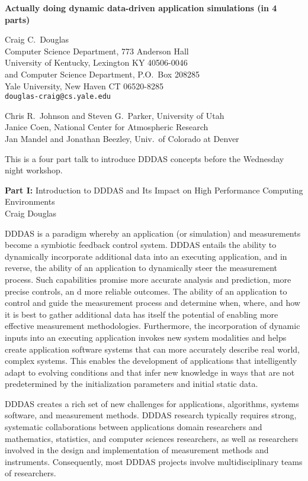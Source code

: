 \documentclass{report}
\begin{document}

\begin{center}
{\large
{\bf Actually doing dynamic data-driven application simulations (in 4 parts)}}

	Craig C.~Douglas \\
	Computer Science Department, 773 Anderson Hall \\
	University of Kentucky, Lexington KY 40506-0046 \\
	and Computer Science Department, P.O.~Box 208285 \\
	Yale University,  New Haven CT 06520-8285 \\
	{\tt douglas-craig@cs.yale.edu}

	Chris R.~Johnson and Steven G.~Parker, University of Utah \\
	Janice Coen, National Center for Atmospheric Research \\
	Jan Mandel and Jonathan Beezley, Univ.~of Colorado at Denver
\end{center}
This is a four part talk to introduce DDDAS concepts before
the Wednesday night workshop.

{\bf Part I:} Introduction to DDDAS and Its Impact on High
Performance Computing Environments \\
Craig Douglas

DDDAS is a paradigm whereby an application (or simulation)
and measurements become a symbiotic feedback control system.
DDDAS entails the ability to dynamically incorporate
additional data into an executing application, and in
reverse, the ability of an application to dynamically steer
the measurement process.  Such capabilities promise more
accurate analysis and prediction, more precise controls, an
d more reliable outcomes.  The ability of an application to
control and guide the measurement process and determine
when, where, and how it is best to gather additional data
has itself the potential of enabling more effective
measurement methodologies.  Furthermore, the incorporation
of dynamic inputs into an executing application invokes new
system modalities and helps create application software
systems that can more accurately describe real world,
complex systems.  This enables the development of
applications that intelligently adapt to evolving conditions
and that infer new knowledge in ways that are not
predetermined by the initialization parameters and initial
static data.

DDDAS creates a rich set of new challenges for applications,
algorithms, systems software, and measurement methods.
DDDAS research typically requires strong, systematic
collaborations between applications domain researchers and
mathematics, statistics, and computer sciences researchers,
as well as researchers involved in the design and
implementation of measurement methods and instruments.
Consequently, most DDDAS projects involve multidisciplinary
teams of researchers.
\end{document}
